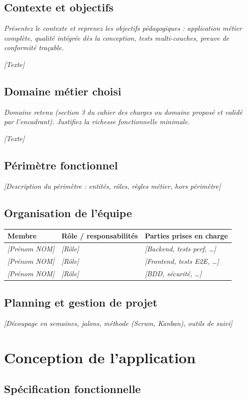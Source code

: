 \documentclass[11pt,a4paper]{article}
\newcommand{\ph}[1]{\textit{[#1]}}
\newcommand{\guide}[1]{\par{\small\itshape #1}\par\medskip}
\begin{document}
\subsection{Contexte et objectifs}
\guide{Pr\'esentez le contexte et reprenez les objectifs p\'edagogiques : application m\'etier compl\`ete, qualit\'e int\'egr\'ee d\`es la conception, tests multi-couches, preuve de conformit\'e tra\c{c}able.}
\ph{Texte}
\subsection{Domaine m\'etier choisi}
\guide{Domaine retenu (section 3 du cahier des charges ou domaine propos\'e et valid\'e par l'encadrant). Justifiez la richesse fonctionnelle minimale.}
\ph{Texte}
\subsection{P\'erim\`etre fonctionnel}
\ph{Description du p\'erim\`etre : entit\'es, r\^oles, r\`egles m\'etier, hors p\'erim\`etre}
\subsection{Organisation de l'\'equipe}
\noindent\begin{tabularx}{\textwidth}{|L{3cm}|Y|Y|}\hline
\textbf{Membre} & \textbf{R\^ole / responsabilit\'es} & \textbf{Parties prises en charge} \\ \hline
\ph{Pr\'enom NOM} & \ph{R\^ole} & \ph{Backend, tests perf, \dots} \\ \hline
\ph{Pr\'enom NOM} & \ph{R\^ole} & \ph{Frontend, tests E2E, \dots} \\ \hline
\ph{Pr\'enom NOM} & \ph{R\^ole} & \ph{BDD, s\'ecurit\'e, \dots} \\ \hline
\end{tabularx}
\subsection{Planning et gestion de projet}
\ph{D\'ecoupage en semaines, jalons, m\'ethode (Scrum, Kanban), outils de suivi}

\section{Conception de l'application}
\subsection{Sp\'ecification fonctionnelle}
\end{document}
